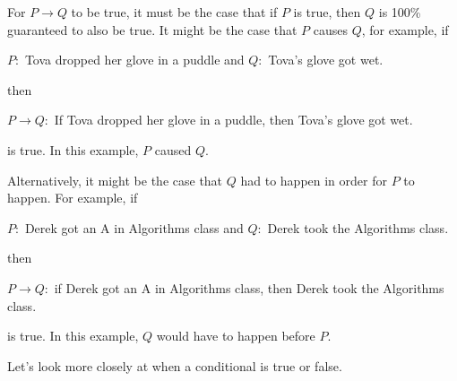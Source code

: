 For $P \to Q$ to be true, it must be the case that if $P$ is true, then $Q$ is 100\% guaranteed to also be true.  It might be the case that $P$ causes $Q$, for example, if   
    \begin{center}
        $P:$ Tova dropped her glove in a puddle and
        $Q:$ Tova's glove got wet. 
    \end{center}
then 
    \begin{center}
        $P \to Q:$ If Tova dropped her glove in a puddle, then Tova's glove got wet.
    \end{center}
is true.  In this example, $P$ caused $Q$.  

Alternatively, it might be the case that $Q$ had to happen in order for $P$ to happen.  For example, if
    \begin{center}
        $P:$ Derek got an A in Algorithms class and  
        $Q:$ Derek took the Algorithms class.   
    \end{center}
then
    \begin{center}
        $P \to Q:$ if Derek got an A in Algorithms class, then Derek took the Algorithms class.
    \end{center}
is true.  In this example, $Q$ would have to happen before $P$.

Let's look more closely at when a conditional is true or false. 

